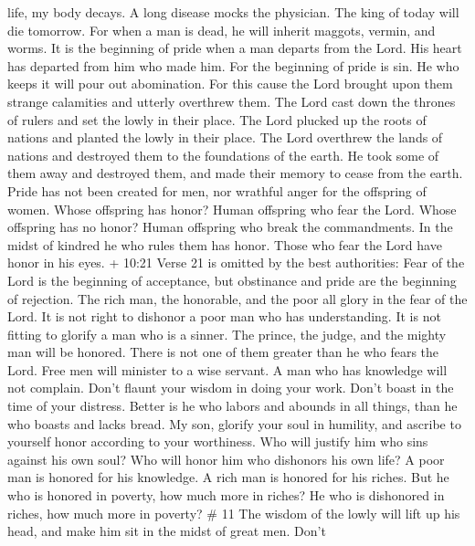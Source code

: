life, my body decays.  A long disease mocks the physician.
The king of today will die tomorrow.  For when a man is
dead, he will inherit maggots, vermin, and worms.  It is
the beginning of pride when a man departs from the Lord. His heart has
departed from him who made him.  For the beginning of pride
is sin. He who keeps it will pour out abomination. For this cause the
Lord brought upon them strange calamities and utterly overthrew them.
 The Lord cast down the thrones of rulers and set the lowly
in their place.  The Lord plucked up the roots of nations
and planted the lowly in their place.  The Lord overthrew
the lands of nations and destroyed them to the foundations of the earth.
 He took some of them away and destroyed them, and made
their memory to cease from the earth.  Pride has not been
created for men, nor wrathful anger for the offspring of women.
 Whose offspring has honor? Human offspring who fear the
Lord. Whose offspring has no honor? Human offspring who break the
commandments.  In the midst of kindred he who rules them
has honor. Those who fear the Lord have honor in his eyes. 
+ 10:21 Verse 21 is omitted by the best authorities: Fear of the Lord is
the beginning of acceptance, but obstinance and pride are the beginning
of rejection.  The rich man, the honorable, and the poor
all glory in the fear of the Lord.  It is not right to
dishonor a poor man who has understanding. It is not fitting to glorify
a man who is a sinner.  The prince, the judge, and the
mighty man will be honored. There is not one of them greater than he who
fears the Lord.  Free men will minister to a wise servant.
A man who has knowledge will not complain.  Don't flaunt
your wisdom in doing your work. Don't boast in the time of your
distress.  Better is he who labors and abounds in all
things, than he who boasts and lacks bread.  My son,
glorify your soul in humility, and ascribe to yourself honor according
to your worthiness.  Who will justify him who sins against
his own soul? Who will honor him who dishonors his own life?
 A poor man is honored for his knowledge. A rich man is
honored for his riches.  But he who is honored in poverty,
how much more in riches? He who is dishonored in riches, how much more
in poverty? \# 11  The wisdom of the lowly will lift up his
head, and make him sit in the midst of great men.  Don't
